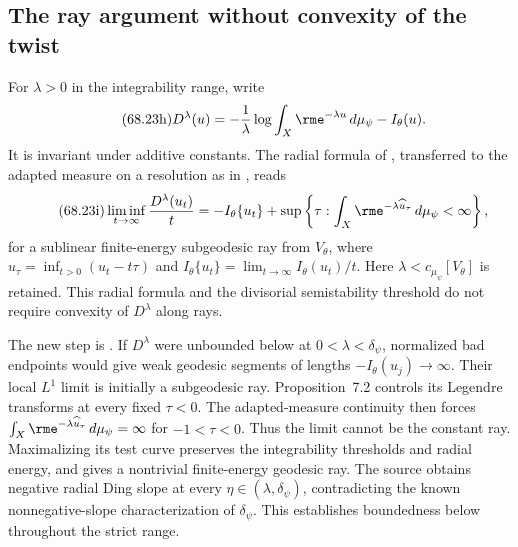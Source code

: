\subsection{The ray argument without convexity of the twist}

For $\lambda>0$ in the integrability range, write
\[
\tag{68.23h}\label{eq:ytd-klt-ding}
 D^\lambda(u)=-\frac1\lambda
        \log\int_X\rme^{-\lambda u}\,d\mu_\psi-I_\theta(u).
\]
It is invariant under additive constants. The radial formula of
\cite[Theorems~1.4 and~4.1]{DarvasZhang24TwistedV4}, transferred
to the adapted measure on a resolution as in
\cite[Section~7.2]{DarvasZhang26KltV2}, reads
\[
\tag{68.23i}\label{eq:ytd-klt-ding-radial}
 \liminf_{t\to\infty}\frac{D^\lambda(u_t)}t
 =-I_\theta\{u_t\}
    +\sup\left\{\tau:\int_X\rme^{-\lambda\widehat u_\tau}
                                         \,d\mu_\psi<\infty\right\},
\]
for a sublinear finite-energy subgeodesic ray from $V_\theta$,
where $\widehat u_\tau=\inf_{t>0}(u_t-t\tau)$ and
$I_\theta\{u_t\}=\lim_{t\to\infty}I_\theta(u_t)/t$.
Here $\lambda<c_{\mu_\psi}[V_\theta]$ is retained. This
radial formula and the divisorial semistability threshold do not
require convexity of $D^\lambda$ along rays.

The new step is \cite[Theorem~7.3]{DarvasZhang26KltV2}.
If $D^\lambda$ were unbounded below at
$0<\lambda<\delta_\psi$, normalized bad endpoints would give
weak geodesic segments of lengths $-I_\theta(u_j)\to\infty$.
Their local $L^1$ limit is initially a subgeodesic ray. Proposition~7.2
controls its Legendre transforms at every fixed $\tau<0$.
The adapted-measure continuity then forces
$\int_X\rme^{-\lambda\widehat u_\tau}\,d\mu_\psi=\infty$
for $-1<\tau<0$. Thus the limit cannot be the constant ray.
Maximalizing its test curve preserves the integrability thresholds
and radial energy, and gives a nontrivial finite-energy geodesic ray.
The source obtains negative radial Ding slope at every
$\eta\in(\lambda,\delta_\psi)$, contradicting the known
nonnegative-slope characterization of $\delta_\psi$.
This establishes boundedness below throughout the strict range.

